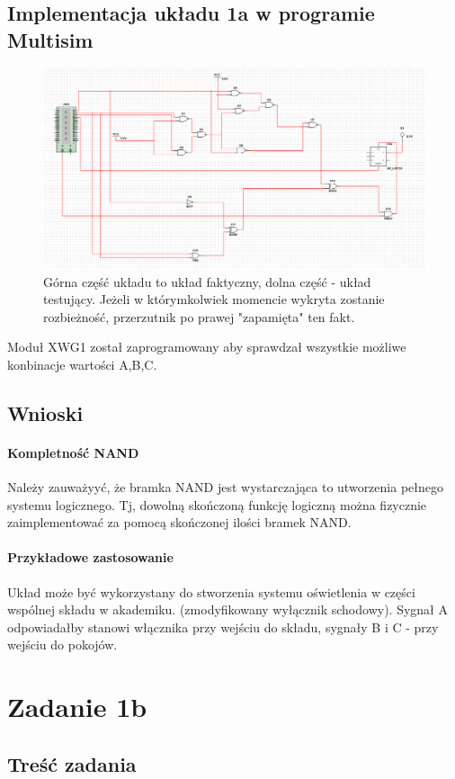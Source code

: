 \documentclass{article}
\begin{document}
\subsection{Implementacja układu 1a w programie Multisim}
\begin{figure}[h!]
\includegraphics[width=\textwidth]{1ap}
\caption{Górna część układu to układ faktyczny, dolna część - układ testujący. Jeżeli w którymkolwiek momencie wykryta zostanie rozbieżność, przerzutnik po prawej "zapamięta" ten fakt.}
\end{figure}
Moduł XWG1 został zaprogramowany aby sprawdzał wszystkie możliwe konbinacje wartości A,B,C.
\subsection{Wnioski}
\paragraph{Kompletność NAND}
Należy zauważyyć, że bramka NAND jest wystarczająca to utworzenia pełnego systemu logicznego. Tj, dowolną skończoną funkcję logiczną można fizycznie zaimplementować za pomocą skończonej ilości bramek NAND. 
\paragraph{Przykładowe zastosowanie}
Układ może być wykorzystany do stworzenia systemu oświetlenia w części wspólnej składu w akademiku. (zmodyfikowany wyłącznik schodowy). Sygnał A odpowiadałby stanowi włącznika przy wejściu do składu, sygnały B i C - przy wejściu do pokojów.
\newpage
\section{Zadanie 1b}
\subsection{Treść zadania}
\end{document}
